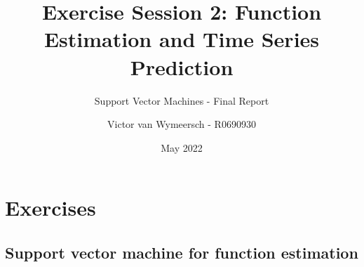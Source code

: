 \documentclass{article}
\title{Exercise Session 2: Function Estimation and Time Series Prediction}
\subtitle{Support Vector Machines - Final Report}
\author{Victor van Wymeersch - R0690930}
\date{May 2022}
\begin{document}
\maketitle

    
    
\section{Exercises} 
    \subsection{Support vector machine for function estimation} 
    
\end{document}
